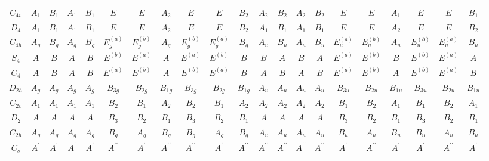 \documentclass[fleqn,10pt,landscape]{jsarticle}
\begin{document}
\begin{table}[ht!]
\begin{center}
\begin{tabular}{ccccccccccccccccccccc}
$ C_{4v} $ & $ A_{1} $ & $ B_{1} $ & $ A_{1} $ & $ B_{1} $ & $ E $ & $ E $ & $ A_{2} $ & $ E $ & $ E $ & $ B_{2} $ & $ A_{2} $ & $ B_{2} $ & $ A_{2} $ & $ B_{2} $ & $ E $ & $ E $ & $ A_{1} $ & $ E $ & $ E $ & $ B_{1} $ \\
$ D_{4} $ & $ A_{1} $ & $ B_{1} $ & $ A_{1} $ & $ B_{1} $ & $ E $ & $ E $ & $ A_{2} $ & $ E $ & $ E $ & $ B_{2} $ & $ A_{1} $ & $ B_{1} $ & $ A_{1} $ & $ B_{1} $ & $ E $ & $ E $ & $ A_{2} $ & $ E $ & $ E $ & $ B_{2} $ \\
$ C_{4h} $ & $ A_{g} $ & $ B_{g} $ & $ A_{g} $ & $ B_{g} $ & $ E_{g}^{(a)} $ & $ E_{g}^{(b)} $ & $ A_{g} $ & $ E_{g}^{(b)} $ & $ E_{g}^{(a)} $ & $ B_{g} $ & $ A_{u} $ & $ B_{u} $ & $ A_{u} $ & $ B_{u} $ & $ E_{u}^{(a)} $ & $ E_{u}^{(b)} $ & $ A_{u} $ & $ E_{u}^{(b)} $ & $ E_{u}^{(a)} $ & $ B_{u} $ \\
$ S_{4} $ & $ A $ & $ B $ & $ A $ & $ B $ & $ E^{(b)} $ & $ E^{(a)} $ & $ A $ & $ E^{(a)} $ & $ E^{(b)} $ & $ B $ & $ B $ & $ A $ & $ B $ & $ A $ & $ E^{(a)} $ & $ E^{(b)} $ & $ B $ & $ E^{(b)} $ & $ E^{(a)} $ & $ A $ \\
$ C_{4} $ & $ A $ & $ B $ & $ A $ & $ B $ & $ E^{(a)} $ & $ E^{(b)} $ & $ A $ & $ E^{(b)} $ & $ E^{(a)} $ & $ B $ & $ A $ & $ B $ & $ A $ & $ B $ & $ E^{(a)} $ & $ E^{(b)} $ & $ A $ & $ E^{(b)} $ & $ E^{(a)} $ & $ B $ \\
$ D_{2h} $ & $ A_{g} $ & $ A_{g} $ & $ A_{g} $ & $ A_{g} $ & $ B_{3g} $ & $ B_{2g} $ & $ B_{1g} $ & $ B_{3g} $ & $ B_{2g} $ & $ B_{1g} $ & $ A_{u} $ & $ A_{u} $ & $ A_{u} $ & $ A_{u} $ & $ B_{3u} $ & $ B_{2u} $ & $ B_{1u} $ & $ B_{3u} $ & $ B_{2u} $ & $ B_{1u} $ \\
$ C_{2v} $ & $ A_{1} $ & $ A_{1} $ & $ A_{1} $ & $ A_{1} $ & $ B_{2} $ & $ B_{1} $ & $ A_{2} $ & $ B_{2} $ & $ B_{1} $ & $ A_{2} $ & $ A_{2} $ & $ A_{2} $ & $ A_{2} $ & $ A_{2} $ & $ B_{1} $ & $ B_{2} $ & $ A_{1} $ & $ B_{1} $ & $ B_{2} $ & $ A_{1} $ \\
$ D_{2} $ & $ A $ & $ A $ & $ A $ & $ A $ & $ B_{3} $ & $ B_{2} $ & $ B_{1} $ & $ B_{3} $ & $ B_{2} $ & $ B_{1} $ & $ A $ & $ A $ & $ A $ & $ A $ & $ B_{3} $ & $ B_{2} $ & $ B_{1} $ & $ B_{3} $ & $ B_{2} $ & $ B_{1} $ \\
$ C_{2h} $ & $ A_{g} $ & $ A_{g} $ & $ A_{g} $ & $ A_{g} $ & $ B_{g} $ & $ A_{g} $ & $ B_{g} $ & $ B_{g} $ & $ A_{g} $ & $ B_{g} $ & $ A_{u} $ & $ A_{u} $ & $ A_{u} $ & $ A_{u} $ & $ B_{u} $ & $ A_{u} $ & $ B_{u} $ & $ B_{u} $ & $ A_{u} $ & $ B_{u} $ \\
$ C_{s} $ & $ A^{\prime} $ & $ A^{\prime} $ & $ A^{\prime} $ & $ A^{\prime} $ & $ A^{\prime\prime} $ & $ A^{\prime} $ & $ A^{\prime\prime} $ & $ A^{\prime\prime} $ & $ A^{\prime} $ & $ A^{\prime\prime} $ & $ A^{\prime\prime} $ & $ A^{\prime\prime} $ & $ A^{\prime\prime} $ & $ A^{\prime\prime} $ & $ A^{\prime} $ & $ A^{\prime\prime} $ & $ A^{\prime} $ & $ A^{\prime} $ & $ A^{\prime\prime} $ & $ A^{\prime} $ \\

\end{tabular}
\end{center}
\end{table}
\end{document}
